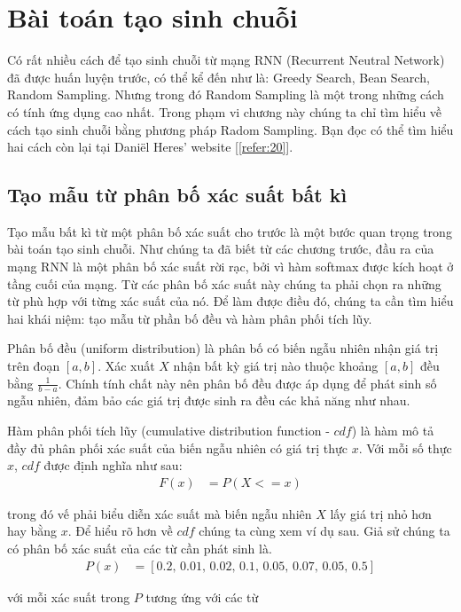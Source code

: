 \section{Bài toán tạo sinh chuỗi}

Có rất nhiều cách để tạo sinh chuỗi từ mạng RNN (Recurrent Neutral Network) đã được huấn luyện trước, có thể kể đến như là: Greedy Search, Bean Search, Random Sampling. Nhưng trong đó Random Sampling là một trong những cách có tính ứng dụng cao nhất. Trong phạm vi chương này chúng ta chỉ tìm hiểu về cách tạo sinh chuỗi bằng phương pháp Radom Sampling. Bạn đọc có thể tìm hiểu hai cách còn lại tại Daniël Heres' website [\ref{refer:20}].

\subsection{Tạo mẫu từ phân bố xác suất bất kì}
Tạo mẫu bất kì từ một phân bố xác suất cho trước là một bước quan trọng trong bài toán tạo sinh chuỗi. Như chúng ta đã biết từ các chương trước, đầu ra của mạng RNN là một phân bố xác suất rời rạc, bởi vì hàm softmax được kích hoạt ở tầng cuối của mạng. Từ các phân bố xác suất này chúng ta phải chọn ra những từ phù hợp với từng xác suất của nó. Để làm được điều đó, chúng ta cần tìm hiểu hai khái niệm: tạo mẫu từ phần bố đều và hàm phân phối tích lũy.

Phân bố đều (uniform distribution) là phân bố có biến ngẫu nhiên nhận giá trị trên đoạn $[a, b]$. Xác xuất $X$ nhận bất kỳ giá trị nào thuộc khoảng $[a, b]$ đều bằng $\frac{1}{b-a}$. Chính tính chất này nên phân bố đều được áp dụng để phát sinh số ngẫu nhiên, đảm bảo các giá trị được sinh ra đều các khả năng như nhau.

Hàm phân phối tích lũy (cumulative distribution function - $cdf$) là hàm mô tả đầy đủ phân phối xác suất của biến ngẫu nhiên có giá trị thực $x$. Với mỗi số thực $x$, $cdf$ được định nghĩa như sau:
\begin{align*}
  F(x) &= P(X <= x)
\end{align*}

trong đó vế phải biểu diễn xác suất mà biến ngẫu nhiên $X$ lấy giá trị nhỏ hơn hay bằng $x$. Để hiểu rõ hơn về $cdf$ chúng ta cùng xem ví dụ sau. Giả sử chúng ta có phân bố xác suất của các từ cần phát sinh là.
\begin{align*}
  P(x) &= [0.2, \, 0.01, \, 0.02, \, 0.1, \, 0.05, \, 0.07, \, 0.05, \, 0.5]
\end{align*}

với mỗi xác suất trong $P$ tương ứng với các từ
\begin{align*}
  ["Hom", \, "nay", \, "toi", \, "di", \, "hoc", \, "Ngay", \, "mai", \, "cung"]
\end{align*}


